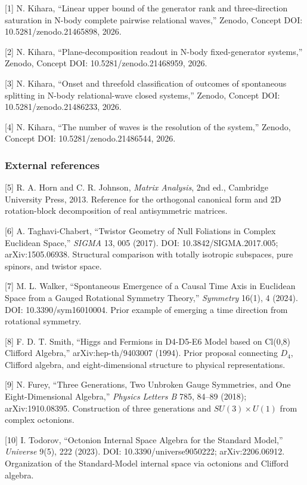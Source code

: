 \documentclass[
  a4paper,
]{article}
\begin{document}
{[}1{]} N. Kihara, ``Linear upper bound of the generator rank and
three-direction saturation in N-body complete pairwise relational
waves,'' Zenodo, Concept DOI: 10.5281/zenodo.21465898, 2026.

{[}2{]} N. Kihara, ``Plane-decomposition readout in N-body
fixed-generator systems,'' Zenodo, Concept DOI: 10.5281/zenodo.21468959,
2026.

{[}3{]} N. Kihara, ``Onset and threefold classification of outcomes of
spontaneous splitting in N-body relational-wave closed systems,''
Zenodo, Concept DOI: 10.5281/zenodo.21486233, 2026.

{[}4{]} N. Kihara, ``The number of waves is the resolution of the
system,'' Zenodo, Concept DOI: 10.5281/zenodo.21486544, 2026.

\subsubsection{External references}\label{external-references}

{[}5{]} R. A. Horn and C. R. Johnson, \emph{Matrix Analysis}, 2nd ed.,
Cambridge University Press, 2013. Reference for the orthogonal canonical
form and 2D rotation-block decomposition of real antisymmetric matrices.

{[}6{]} A. Taghavi-Chabert, ``Twistor Geometry of Null Foliations in
Complex Euclidean Space,'' \emph{SIGMA} 13, 005 (2017). DOI:
10.3842/SIGMA.2017.005; arXiv:1505.06938. Structural comparison with
totally isotropic subspaces, pure spinors, and twistor space.

{[}7{]} M. L. Walker, ``Spontaneous Emergence of a Causal Time Axis in
Euclidean Space from a Gauged Rotational Symmetry Theory,''
\emph{Symmetry} 16(1), 4 (2024). DOI: 10.3390/sym16010004. Prior example
of emerging a time direction from rotational symmetry.

{[}8{]} F. D. T. Smith, ``Higgs and Fermions in D4-D5-E6 Model based on
Cl(0,8) Clifford Algebra,'' arXiv:hep-th/9403007 (1994). Prior proposal
connecting \(D_4\), Clifford algebra, and eight-dimensional structure to
physical representations.

{[}9{]} N. Furey, ``Three Generations, Two Unbroken Gauge Symmetries,
and One Eight-Dimensional Algebra,'' \emph{Physics Letters B} 785,
84--89 (2018); arXiv:1910.08395. Construction of three generations and
\(SU(3)\times U(1)\) from complex octonions.

{[}10{]} I. Todorov, ``Octonion Internal Space Algebra for the Standard
Model,'' \emph{Universe} 9(5), 222 (2023). DOI: 10.3390/universe9050222;
arXiv:2206.06912. Organization of the Standard-Model internal space via
octonions and Clifford algebra.
\end{document}
